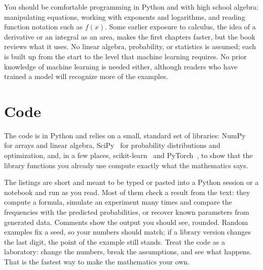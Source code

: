 You should be comfortable programming in Python and with high school
algebra: manipulating equations, working with exponents and logarithms,
and reading function notation such as $f(x)$. Some earlier exposure to
calculus, the idea of a derivative or an integral as an area, makes the
first chapters faster, but the book reviews what it uses. No linear
algebra, probability, or statistics is assumed; each is built up from
the start to the level that machine learning requires. No prior
knowledge of machine learning is needed either, although readers who
have trained a model will recognize more of the examples.

\section*{Code}

The code is in Python and relies on a small, standard set of libraries:
NumPy~\cite{harris2020numpy} for arrays and linear algebra,
SciPy~\cite{virtanen2020scipy} for probability distributions and
optimization, and, in a few places, scikit-learn~\cite{pedregosa2011sklearn}
and PyTorch~\cite{paszke2019pytorch}, to
show that the library functions you already use compute exactly what
the mathematics says.

The listings are short and meant to be typed or pasted into a Python
session or a notebook and run as you read. Most of them check a result
from the text: they compute a formula, simulate an experiment many times
and compare the frequencies with the predicted probabilities, or
recover known parameters from generated data. Comments show the output
you should see, rounded. Random examples fix a seed, so your numbers
should match; if a library version changes the last digit, the point of
the example still stands. Treat the code as a laboratory: change the
numbers, break the assumptions, and see what happens. That is the
fastest way to make the mathematics your own.
